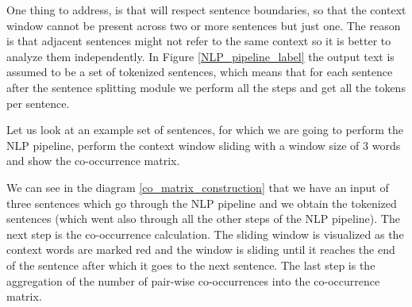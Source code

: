 \documentclass[12pt]{article}
\numberwithin{equation}{section}
\begin{document}
\begin{spacing}{1.5}
	One thing to address, is that will respect sentence boundaries, so that the context window cannot be present across two or more sentences but just one. The reason is that adjacent sentences might not refer to the same context so it is better to analyze them independently. In Figure \ref{NLP_pipeline_label} the output text is assumed to be a set of tokenized sentences, which means that for each sentence after the sentence splitting module we perform all the steps and get all the tokens per sentence.
	
	Let us look at an example set of sentences, for which we are going to perform the NLP pipeline, perform the context window sliding with a window size of $3$ words and show the co-occurrence matrix.
	
	We can see in the diagram \ref{co_matrix_construction} that we have an input of three sentences which go through the NLP pipeline and we obtain the tokenized sentences (which went also through all the other steps of the NLP pipeline). The next step is the co-occurrence calculation. The sliding window is visualized as the context words are marked red and the window is sliding until it reaches the end of the sentence after which it goes to the next sentence. The last step is the aggregation of the number of pair-wise co-occurrences into the co-occurrence matrix.
	

\end{spacing}
\end{document}
